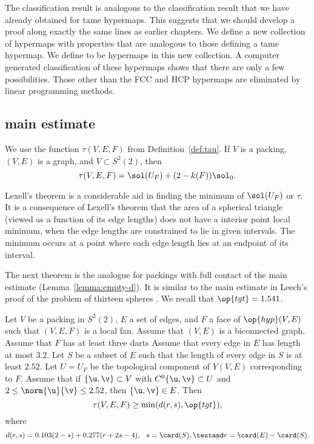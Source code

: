 The classification result is analogous to the classification result
that we have already obtained for tame hypermaps.  This suggests that
we should develop a proof along exactly the same lines as earlier
chapters.  We  define a new collection of hypermaps with
properties that are analogous to those defining a tame hypermap.  We 
define  to be hypermaps in this
new collection.  A computer generated classification of these
hypermaps  shows that there are only a few possibilities.  Those
other than the FCC and HCP hypermaps  are eliminated by linear
programming methods.

\subsection{main estimate}




We use the function $\tau(V,E,F)$ from Definition~\ref{def:tau}.  If
$V$ is a packing, $(V,E)$ is a  graph, and
$V\subset S^2(2)$, then 
\[
\tau(V,E,F) = \sol(U_F) + (2-k(F)) \sol_0.
\]

\begin{remark}
Lexell's theorem is a considerable aid in finding the minimum of
  $\sol(U_F)$ or $\tau$.
  It is a consequence of Lexell's theorem that the area of a spherical
  triangle (viewed as a function of its edge lengths) does not have a
  interior point local minimum, when the edge lengths are
  constrained to lie in given intervals.  The minimum occurs at a
  point where each edge length lies at an endpoint of its interval.
\end{remark}

The next theorem is the analogue for packings with full contact of the
main estimate (Lemma~\ref{lemma:empty-d}).  It is similar to the main
estimate in Leech's proof of the problem of thirteen spheres
\cite{Leech:1956:MG}.  We recall that $\op{tgt}=1.541$.
%
%


\begin{theorem}\label{lemma:main-estimate-12}
  Let $V$ be a packing in $S^2(2)$, $E$ a set of edges, and $F$ a face
  of $\op{hyp}(V,E)$ such that $(V,E,F)$ is a local fan.  Assume that
  $(V,E)$ is a biconnected graph.  Assume that $F$ has at least three
  darts Assume that every edge in $E$ has length at most $3.2$.  Let
  $S$ be a subset of $E$ such that the length of every edge in $S$ is
  at least $2.52$.  Let $U=U_F$ be the topological component of
  $Y(V,E)$ corresponding to $F$.  Assume that if $\{\u,\v\}\subset V$
  with $C^0\{\u,\v\}\subset U$ and $2\le\norm{\u}{\v} \le 2.52$, then
  $\{\u,\v\}\in E$.  Then
\[\tau(V,E,F) \ge \min(d(r,s),\op{tgt}),\]
where
\[
d(r,s) = 0.103 (2-s) + 0.277 (r+2s-4),\ \ 
s = \card(S),\textand  r = \card(E)-\card(S).
\]
\end{theorem}

